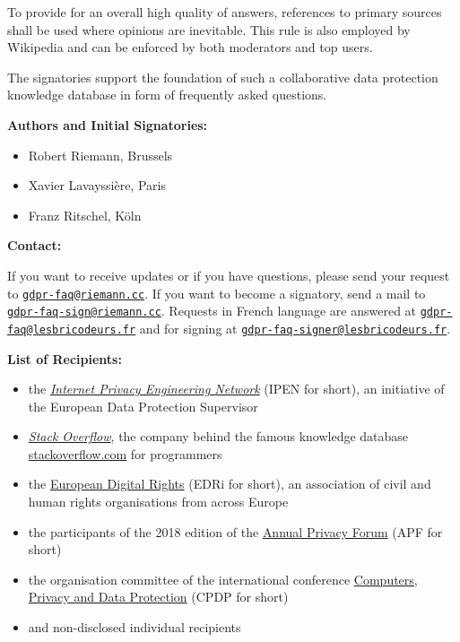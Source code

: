\documentclass{scrlttr2}
\let\tightlist\relax
\begin{document}
\begin{letter}{}
To provide for an overall high quality of answers, references to primary
sources shall be used where opinions are inevitable. This rule is also
employed by Wikipedia and can be enforced by both moderators and top
users.

The signatories support the foundation of such a collaborative data
protection knowledge database in form of frequently asked questions.

\textbf{Authors and Initial Signatories:}

\begin{itemize}
\tightlist
\item
  Robert Riemann, Brussels
\item
  Xavier Lavayssière, Paris
\item
  Franz Ritschel, Köln
\end{itemize}


\textbf{Contact:}

If you want to receive updates or if you have questions, please send
your request to
\href{mailto:gdpr-faq@riemann.cc}{\nolinkurl{gdpr-faq@riemann.cc}}. If
you want to become a signatory, send a mail to
\href{mailto:gdpr-faq-sign@riemann.cc}{\nolinkurl{gdpr-faq-sign@riemann.cc}}.
Requests in French language are answered at
\href{mailto:gdpr-faq@lesbricodeurs.fr}{\nolinkurl{gdpr-faq@lesbricodeurs.fr}}
and for signing at
\href{mailto:gdpr-faq-signer@lesbricodeurs.fr}{\nolinkurl{gdpr-faq-signer@lesbricodeurs.fr}}.

\newpage

\textbf{List of Recipients:}

\begin{itemize}
\tightlist
\item
  the
  \emph{\href{https://edps.europa.eu/data-protection/ipen-internet-privacy-engineering-network_en}{Internet
  Privacy Engineering Network}} (IPEN for short), an initiative of the
  European Data Protection Supervisor
\item
  \emph{\href{https://stackoverflow.com/company}{Stack Overflow}}, the
  company behind the famous knowledge database
  \href{https://stackoverflow.com}{stackoverflow.com} for programmers
\item
  the \href{https://edri.org/}{European Digital Rights} (EDRi for
  short), an association of civil and human rights organisations from
  across Europe
\item
  the participants of the 2018 edition of the
  \href{http://privacyforum.eu/}{Annual Privacy Forum} (APF for short)
\item
  the organisation committee of the international conference
  \href{http://www.cpdpconferences.org/}{Computers, Privacy and Data
  Protection} (CPDP for short)
\item
  and non-disclosed individual recipients
\end{itemize}


\end{letter}
\end{document}
